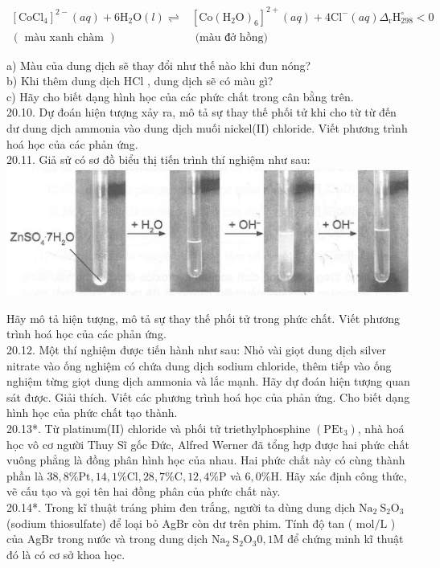 \documentclass[10pt]{article}
\begin{document}
$$
\begin{aligned}
{\left[\mathrm{CoCl}_{4}\right]^{2-}(a q)+6 \mathrm{H}_{2} \mathrm{O}(l) \rightleftharpoons } & {\left[\mathrm{Co}\left(\mathrm{H}_{2} \mathrm{O}\right)_{6}\right]^{2+}(a q)+4 \mathrm{Cl}^{-}(a q) \Delta_{\mathrm{r}} \mathrm{H}_{298}^{\circ}<0 } \\
(\text { màu xanh chàm }) & \text { (màu đở hồng) }
\end{aligned}
$$

a) Màu của dung dịch sẽ thay đổi như thế nào khi đun nóng?\\
b) Khi thêm dung dịch HCl , dung dịch sẽ có màu gì?\\
c) Hãy cho biết dạng hình học của các phức chất trong cân bằng trên.\\
20.10. Dự đoán hiện tượng xảy ra, mô tả sự thay thế phối tử khi cho từ từ đến dư dung dịch ammonia vào dung dịch muối nickel(II) chloride. Viết phương trình hoá học của các phản ứng.\\
20.11. Giả sử có sơ đồ biểu thị tiến trình thí nghiệm như sau:\\
\includegraphics[max width=\textwidth, center]{2025_10_23_de6f5713836e4e91b3c8g-128}

Hãy mô tả hiện tượng, mô tả sự thay thế phối tử trong phức chất. Viết phương trình hoá học của các phản ứng.\\
20.12. Một thí nghiệm được tiến hành như sau: Nhỏ vài giọt dung dịch silver nitrate vào ống nghiệm có chứa dung dịch sodium chloride, thêm tiếp vào ống nghiệm từng giọt dung dịch ammonia và lắc mạnh. Hãy dự đoán hiện tượng quan sát được. Giải thích. Viết các phương trình hoá học của phản ứng. Cho biết dạng hình học của phức chất tạo thành.\\
20.13*. Từ platinum(II) chloride và phối tử triethylphosphine $\left(\mathrm{PEt}_{3}\right)$, nhà hoá học vô cơ người Thuy Sĩ gốc Đức, Alfred Werner đã tổng hợp được hai phức chất vuông phẳng là đồng phân hình học của nhau. Hai phức chất này có cùng thành phần là $38,8 \% \mathrm{Pt}, 14,1 \% \mathrm{Cl}, 28,7 \% \mathrm{C}, 12,4 \% \mathrm{P}$ và $6,0 \% \mathrm{H}$. Hãy xác định công thức, vẽ cấu tạo và gọi tên hai đồng phân của phức chất này.\\
20.14*. Trong kĩ thuật tráng phim đen trắng, người ta dùng dung dịch $\mathrm{Na}_{2} \mathrm{~S}_{2} \mathrm{O}_{3}$ (sodium thiosulfate) để loại bỏ AgBr còn dư trên phim. Tính độ tan ( $\mathrm{mol} / \mathrm{L}$ ) của AgBr trong nước và trong dung dịch $\mathrm{Na}_{2} \mathrm{~S}_{2} \mathrm{O}_{3} 0,1 \mathrm{M}$ để chứng minh kĩ thuật đó là có cơ sở khoa học.
\end{document}
